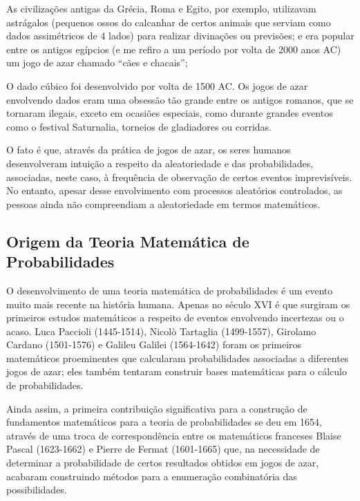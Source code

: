 \documentclass[
]{book}
\theoremstyle{definition}
\theoremstyle{definition}
\theoremstyle{definition}
\theoremstyle{remark}
\begin{document}
As civilizações antigas da Grécia, Roma e Egito, por exemplo, utilizavam astrágalos (pequenos ossos do calcanhar de certos animais que serviam como dados assimétricos de 4 lados) para realizar divinações ou previsões; e era popular entre os antigos egípcios (e me refiro a um período por volta de 2000 anos AC) um jogo de azar chamado ``cães e chacais'';

O dado cúbico foi desenvolvido por volta de 1500 AC. Os jogos de azar envolvendo dados eram uma obsessão tão grande entre os antigos romanos, que se tornaram ilegais, exceto em ocasiões especiais, como durante grandes eventos como o festival Saturnalia, torneios de gladiadores ou corridas.

O fato é que, através da prática de jogos de azar, os seres humanos desenvolveram intuição a respeito da aleatoriedade e das probabilidades, associadas, neste caso, à frequência de observação de certos eventos imprevisíveis. No entanto, apesar desse envolvimento com processos aleatórios controlados, as pessoas ainda não compreendiam a aleatoriedade em termos matemáticos.

\hypertarget{origem-da-teoria-matemuxe1tica-de-probabilidades}{%
\subsection*{Origem da Teoria Matemática de Probabilidades}\label{origem-da-teoria-matemuxe1tica-de-probabilidades}}

O desenvolvimento de uma teoria matemática de probabilidades é um evento muito mais recente na história humana. Apenas no século XVI é que surgiram os primeiros estudos matemáticos a respeito de eventos envolvendo incertezas ou o acaso. Luca Paccioli (1445-1514), Nicolò Tartaglia (1499-1557), Girolamo Cardano (1501-1576) e Galileu Galilei (1564-1642) foram os primeiros matemáticos proeminentes que calcularam probabilidades associadas a diferentes jogos de azar; eles também tentaram construir bases matemáticas para o cálculo de probabilidades.

Ainda assim, a primeira contribuição significativa para a construção de fundamentos matemáticos para a teoria de probabilidades se deu em 1654, através de uma troca de correspondência entre os matemáticos franceses Blaise Pascal (1623-1662) e Pierre de Fermat (1601-1665) que, na necessidade de determinar a probabilidade de certos resultados obtidos em jogos de azar, acabaram construindo métodos para a enumeração combinatória das possibilidades.
\end{document}
